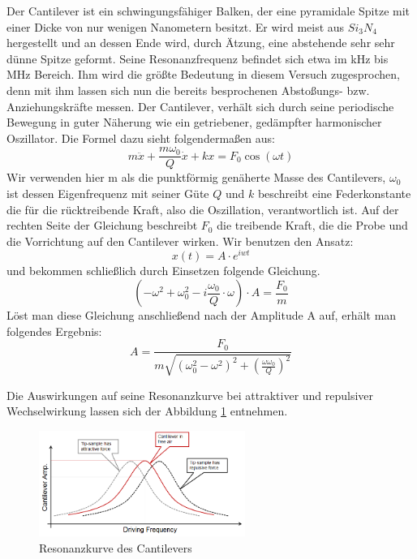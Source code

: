  
Der Cantilever ist ein schwingungsfähiger Balken, der eine pyramidale Spitze mit einer Dicke von nur wenigen Nanometern besitzt.
Er wird meist aus $Si_3N_4$ hergestellt und an dessen Ende wird, durch Ätzung, eine abstehende sehr sehr dünne Spitze geformt.
Seine Resonanzfrequenz befindet sich etwa im kHz bis MHz Bereich.
Ihm wird die größte Bedeutung in diesem Versuch zugesprochen, denn mit ihm lassen sich nun die bereits besprochenen Abstoßungs- bzw. Anziehungskräfte messen.
Der Cantilever, verhält sich durch seine periodische Bewegung in guter Näherung wie ein getriebener, gedämpfter harmonischer Oszillator. 
Die Formel dazu sieht folgendermaßen aus:
\[
    m \ddot{x} + \frac{m \omega_0}{Q} \dot{x} + kx = F_0 \cos(\omega t)
\]
Wir verwenden hier m als die punktförmig genäherte Masse des Cantilevers, $\omega_0$ ist dessen Eigenfrequenz mit seiner Güte $Q$ und $k$ beschreibt eine Federkonstante die für die rücktreibende Kraft, also die Oszillation, verantwortlich ist.
Auf der rechten Seite der Gleichung beschreibt $F_0$ die treibende Kraft, die die Probe und die Vorrichtung auf den Cantilever wirken.
Wir benutzen den Ansatz:
\[
    x(t)=A \cdot e^{iwt}
\]
und bekommen schließlich durch Einsetzen folgende Gleichung.
\[
   \left(-\omega^2+\omega_0^2-i\frac{\omega_0}{Q} \cdot \omega \right) \cdot A 
   = \frac{F_0}{m}
\]
Löst man diese Gleichung anschließend nach der Amplitude A auf, erhält man 
folgendes Ergebnis:
\[
    A = \frac{F_0}{m \sqrt{ ( \omega_0^2 - \omega^2 )^2 + \left( \frac{\omega 
        \omega_0}{Q} \right)^2}}
\]

Die Auswirkungen auf seine Resonanzkurve bei attraktiver und repulsiver Wechselwirkung lassen sich der Abbildung \ref{vorb_sweep} entnehmen.

\begin{figure}[h!]
    \centering
    \includegraphics[width=0.6\textwidth]{Abb/freqsweep.png}
    \caption{Resonanzkurve des Cantilevers}
    \label{vorb_sweep}
\end{figure}

       
